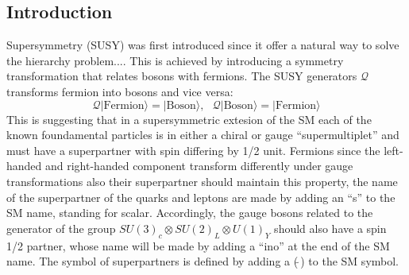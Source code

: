 \subsection{Introduction}
Supersymmetry (SUSY) was first introduced since it offer a natural way to solve the hierarchy problem....\cite{}
This is achieved by introducing a symmetry transformation that relates bosons with fermions. The SUSY generators $\mathcal{Q}$ 
transforms fermion into bosons and vice versa:
\begin{equation}
\mathcal{Q}|\text{Fermion}\rangle = |\text{Boson}\rangle, ~ ~ ~ \mathcal{Q}|\text{Boson}\rangle = |\text{Fermion}\rangle
\end{equation}
This is suggesting that in a supersymmetric extesion of the SM \cite{page7Martins} each of the known foundamental particles 
is in either a chiral or gauge ``supermultiplet'' and must have a superpartner with spin differing by 1/2 unit.
Fermions since the left-handed and right-handed component transform differently under gauge transformations also their superpartner 
should maintain this property, the name of the superpartner of the quarks and leptons are made by adding an ``s'' to the SM name, standing for scalar.
Accordingly, the gauge bosons related to the generator of the group $SU(3)_c \otimes SU(2)_L \otimes U(1)_Y$ should also have a spin 1/2 partner,
whose name will be made by adding a ``ino'' at the end of the SM name. The symbol of superpartners is defined by adding a ($\tilde{ ~ }$) to the SM symbol.

